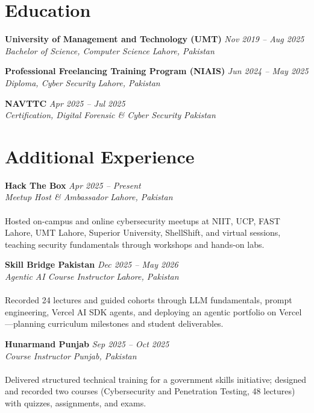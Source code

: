 \documentclass[11pt,a4paper]{article}
\newcommand{\resumeSubheading}[4]{%
  \textbf{#1} \hfill \textit{#2} \\
  \textit{#3} \hfill \textit{#4} \\
}
\begin{document}
\section{Education}

\resumeSubheading{University of Management and Technology (UMT)}{Nov 2019 -- Aug 2025}{Bachelor of Science, Computer Science}{Lahore, Pakistan}

\vspace{4pt}

\resumeSubheading{Professional Freelancing Training Program (NIAIS)}{Jun 2024 -- May 2025}{Diploma, Cyber Security}{Lahore, Pakistan}

\vspace{4pt}

\resumeSubheading{NAVTTC}{Apr 2025 -- Jul 2025}{Certification, Digital Forensic \& Cyber Security}{Pakistan}

\section{Additional Experience}

\resumeSubheading{Hack The Box}{Apr 2025 -- Present}{Meetup Host \& Ambassador}{Lahore, Pakistan} \\
Hosted on-campus and online cybersecurity meetups at NIIT, UCP, FAST Lahore, UMT Lahore, Superior University, ShellShift, and virtual sessions, teaching security fundamentals through workshops and hands-on labs.

\vspace{4pt}

\resumeSubheading{Skill Bridge Pakistan}{Dec 2025 -- May 2026}{Agentic AI Course Instructor}{Lahore, Pakistan} \\
Recorded 24 lectures and guided cohorts through LLM fundamentals, prompt engineering, Vercel AI SDK agents, and deploying an agentic portfolio on Vercel---planning curriculum milestones and student deliverables.

\vspace{4pt}

\resumeSubheading{Hunarmand Punjab}{Sep 2025 -- Oct 2025}{Course Instructor}{Punjab, Pakistan} \\
Delivered structured technical training for a government skills initiative; designed and recorded two courses (Cybersecurity and Penetration Testing, 48 lectures) with quizzes, assignments, and exams.
\end{document}
